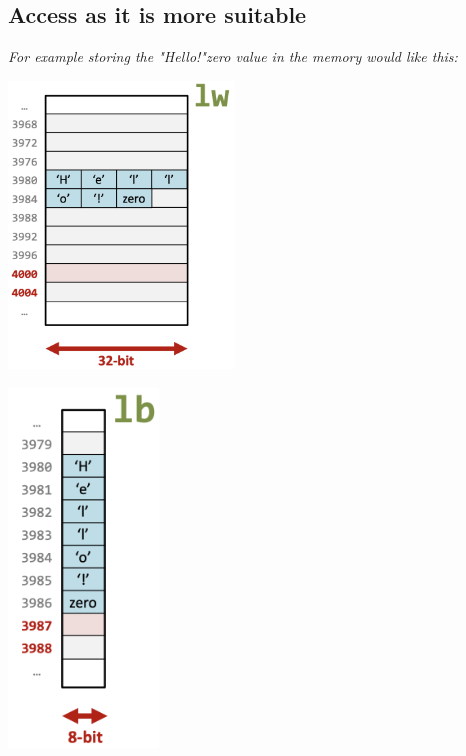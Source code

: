 \subsection{Access as it is more suitable}
\textit{For example storing the "Hello!"zero value in the memory would like this:} \\
\begin{minipage}[htp]{0.45\textwidth}
    \begin{center}
        \includegraphics[width=0.45\textwidth]{chapters/chapter1c/images/hello.png}
    \end{center}
\end{minipage}
\hfill
\vline
\hfill
\begin{minipage}[htp]{ .45\textwidth}
    \begin{center}
        \includegraphics[width=0.3\textwidth]{chapters/chapter1c/images/hello2.png}
    \end{center}
\end{minipage}
